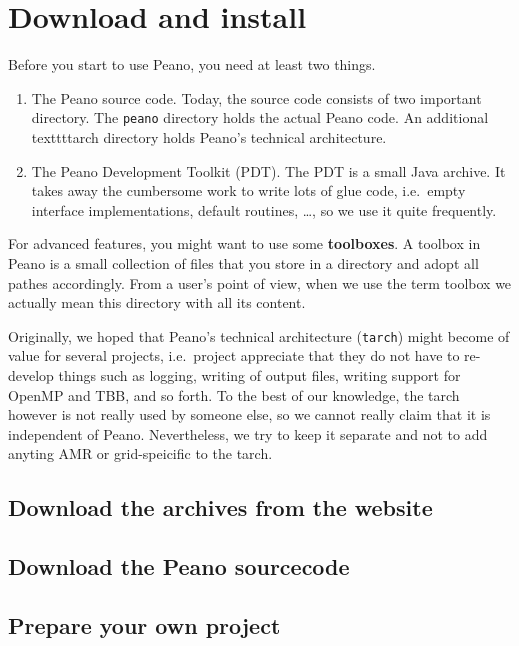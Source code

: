 \chapter{Download and install}

Before you start to use Peano, you need at least two things.

\begin{enumerate}
  \item The Peano source code. Today, the source code consists of two important
  directory. The \texttt{peano} directory holds the actual Peano code. An
  additional texttt{tarch} directory holds Peano's technical architecture.
  \item The Peano Development Toolkit (PDT). The PDT is a small Java archive. It
  takes away the cumbersome work to write lots of glue code, i.e.~empty
  interface implementations, default routines, \ldots, so we use it quite
  frequently.
\end{enumerate}

\noindent
For advanced features, you might want to use some {\bf toolboxes}.
A toolbox in Peano is a small collection of files that you store in a directory
and adopt all pathes accordingly.
From a user's point of view, when we use the term toolbox we actually mean this
directory with all its content.



\begin{history}
Originally, we hoped that Peano's technical architecture (\texttt{tarch}) might
become of value for several projects, i.e.~project appreciate that they do not
have to re-develop things such as logging, writing of output files, writing
support for OpenMP and TBB, and so forth.
To the best of our knowledge, the tarch however is not really used by someone
else, so we cannot really claim that it is independent of Peano.
Nevertheless, we try to keep it separate and not to add anyting AMR or
grid-speicific to the tarch.
\end{history}


\section{Download the archives from the website}

%
%

\section{Download the Peano sourcecode}


\section{Prepare your own project}
